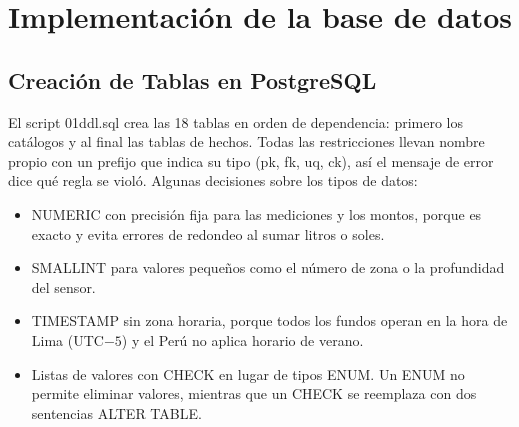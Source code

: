 \documentclass[11pt,letterpaper]{article}
\newcommand{\tbus}{\textunderscore\allowbreak}
\newcommand{\tb}[1]{{\ttfamily\let\_\tbus #1}}
\begin{document}
\section{Implementación de la base de datos}

\subsection{Creación de Tablas en PostgreSQL}

El script \tb{01\_ddl.sql} crea las 18 tablas en orden de dependencia: primero los catálogos y al final las tablas de hechos. Todas las restricciones llevan nombre propio con un prefijo que indica su tipo (\tb{pk\_}, \tb{fk\_}, \tb{uq\_}, \tb{ck\_}), así el mensaje de error dice qué regla se violó. Algunas decisiones sobre los tipos de datos:

\begin{itemize}[leftmargin=1.4em,itemsep=0.1em]
\item \tb{NUMERIC} con precisión fija para las mediciones y los montos, porque es exacto y evita errores de redondeo al sumar litros o soles.
\item \tb{SMALLINT} para valores pequeños como el número de zona o la profundidad del sensor.
\item \tb{TIMESTAMP} sin zona horaria, porque todos los fundos operan en la hora de Lima (UTC$-5$) y el Perú no aplica horario de verano.
\item Listas de valores con \tb{CHECK} en lugar de tipos \tb{ENUM}. Un \tb{ENUM} no permite eliminar valores, mientras que un \tb{CHECK} se reemplaza con dos sentencias \tb{ALTER TABLE}.
\end{itemize}
\end{document}
